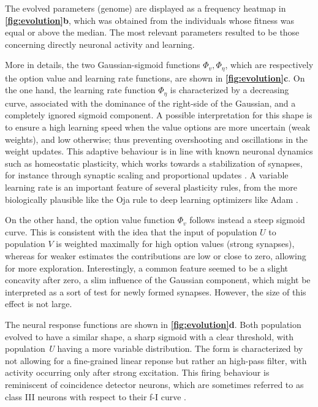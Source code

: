 The evolved parameters (genome) are displayed as a frequency heatmap in \textbf{\ref{fig:evolution}b}, which was obtained from the individuals whose fitness was equal or above the median. The most relevant parameters resulted to be those concerning directly neuronal activity and learning.

More in details, the two Gaussian-sigmoid functions $\Phi_{v}, \Phi_{\eta}$, which are respectively the option value and learning rate functions, are shown in \textbf{\ref{fig:evolution}c}.
On the one hand, the learning rate function $\Phi_{\eta}$ is characterized by a decreasing curve, associated with the dominance of the right-side of the Gaussian, and a completely ignored sigmoid component.
A possible interpretation for this shape is to ensure a high learning speed when the value options are more uncertain (weak weights), and low otherwise; thus preventing overshooting and oscillations in the weight updates.
This adaptive behaviour is in line with known neuronal dynamics such as homeostatic plasticity, which works towards a stabilization of synapses, for instance through synaptic scaling and proportional updates \cite{citriSynapticPlasticityMultiple2008}.
A variable learning rate is an important feature of several plasticity rules, from the more biologically plausible like the Oja rule \cite{ojaOjaLearningRule2008} to deep learning optimizers like Adam \cite{kingmaAdamMethodStochastic2017}.

On the other hand, the option value function $\Phi_{v}$ follows instead a steep sigmoid curve.
This is consistent with the idea that the input of population $U$ to population $V$ is weighted maximally for high option values (strong synapses), whereas for weaker estimates the contributions are low or close to zero, allowing for more exploration.
Interestingly, a common feature seemed to be a slight concavity after zero, a slim influence of the Gaussian component, which might be interpreted as a sort of test for newly formed synapses. However, the size of this effect is not large.

The neural response functions are shown in \textbf{\ref{fig:evolution}d}. Both population evolved to have a similar shape, a sharp sigmoid with a clear threshold, with population \textit{U} having a more variable distribution.
The form is characterized by not allowing for a fine-grained linear reponse but rather an high-pass filter, with activity occurring only after strong excitation.
This firing behaviour is reminiscent of coincidence detector neurons, which are sometimes referred to as class III neurons with respect to their f-I curve \cite{ratteImpactNeuronalProperties2013}.


